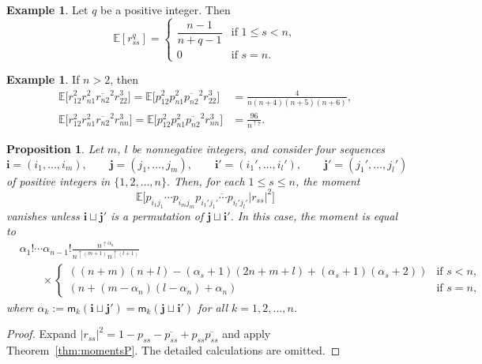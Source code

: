 \documentclass[10pt,a4paper]{amsart}
\numberwithin{equation}{section}
\newtheorem{Proposition}[Theorem]{Proposition}
\theoremstyle{definition}
\newtheorem{Example}[Theorem]{Example}
\newcommand{\mult}{\mathsf{m}}
\begin{document}
\begin{Example}\label{ex:rss_q}
Let $q$ be a positive integer. Then
\[
\mathbb{E} [ r_{ss}^q ]= \begin{cases}
\dfrac{n-1}{n+q-1} & \text{if $1 \le s<n$}, \\
0 & \text{if $s=n$}.
\end{cases}
\]
\end{Example}


\begin{Example}\label{ex:mixed_r}
If $n > 2$, then
\begin{align*}
\mathbb{E} \bigl[r_{12}^2 r_{n1}^2 \overline{r_{n2}}^2 r_{22}^3\bigr]
= \mathbb{E} \bigl[p_{12}^2 p_{n1}^2 \overline{p_{n2}}^2 r_{22}^3\bigr]
&=\frac{4}{n(n+4)(n+5)(n+6)}, \\
\mathbb{E} \bigl[r_{12}^2 r_{n1}^2 \overline{r_{n2}}^2 r_{nn}^3\bigr]
=\mathbb{E} \bigl[p_{12}^2 p_{n1}^2 \overline{p_{n2}}^2 r_{nn}^3\bigr]
&= \frac{96}{n^{\uparrow 7}}.
\end{align*}
\end{Example}

\begin{Proposition} \label{prop:two_r}
Let $m$, $l$ be nonnegative integers, and consider four sequences
\[
\bm{i}=(i_1,\dots, i_m), \qquad \bm{j} =(j_1,\dots, j_m), \qquad
\bm{i}'=(i_1',\dots, i_l'), \qquad \bm{j}' =(j_1',\dots, j_l')
\]
 of positive integers in $\{1,2,\dots,n\}.$
Then, for each $1 \le s \le n$, the moment
\[
\mathbb{E} \bigl[p_{i_1 j_1} \cdots p_{i_m j_m} \overline{p_{i_1' j_1'} \cdots p_{i_l' j_l'}} |r_{ss}|^2 \bigr]
\]
 vanishes unless $\bm{i} \sqcup \bm{j}'$ is a permutation of $\bm{j} \sqcup \bm{i}'$.
In this case, the moment is equal to
\begin{align*}
&\alpha_1 ! \cdots \alpha_{n-1}! \frac{n^{\uparrow \alpha_n}}{n^{\uparrow (m+1)} n^{\uparrow (l+1)}} \\
& \qquad \times
\begin{cases}
 ( (n+m)(n+l) -(\alpha_s+1)(2n+m+l) +(\alpha_s+1)(\alpha_s+2) ) & \text{if $s<n$},
\\
 ( n +(m-\alpha_n)(l-\alpha_n) + \alpha_n ) & \text{if $s=n$},
\end{cases}
\end{align*}
where $\alpha_k:=\mult_{k}(\bm{i}\sqcup \bm{j}') = \mult_{k}(\bm{j}\sqcup\bm{i}')$
for all $k=1,2,\dots, n$.
\end{Proposition}

\begin{proof}
Expand $|r_{ss}|^2 = 1- p_{ss} -\overline{p_{ss}} +p_{ss}\overline{p_{ss}}$ and apply Theorem~\ref{thm:momentsP}.
The detailed calculations are omitted.
\end{proof}
\end{document}

